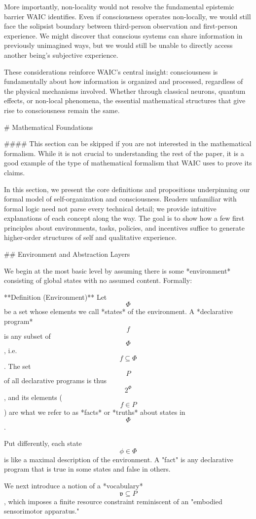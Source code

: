 More importantly, non-locality would not resolve the fundamental epistemic barrier WAIC identifies. Even if consciousness operates non-locally, we would still face the solipsist boundary between third-person observation and first-person experience. We might discover that conscious systems can share information in previously unimagined ways, but we would still be unable to directly access another being's subjective experience.

These considerations reinforce WAIC's central insight: consciousness is fundamentally about how information is organized and processed, regardless of the physical mechanisms involved. Whether through classical neurons, quantum effects, or non-local phenomena, the essential mathematical structures that give rise to consciousness remain the same.

# Mathematical Foundations

#### This section can be skipped if you are not interested in the mathematical formalism. While it is not crucial to understanding the rest of the paper, it is a good example of the type of mathematical formalism that WAIC uses to prove its claims.

In this section, we present the core definitions and propositions underpinning our formal model of self-organization and consciousness. Readers unfamiliar with formal logic need not parse every technical detail; we provide intuitive explanations of each concept along the way. The goal is to show how a few first principles about environments, tasks, policies, and incentives suffice to generate higher-order structures of self and qualitative experience.

## Environment and Abstraction Layers

We begin at the most basic level by assuming there is some *environment* consisting of global states with no assumed content. Formally:

**Definition (Environment)**
Let $$\Phi$$ be a set whose elements we call *states* of the environment. 
A *declarative program* $$f$$ is any subset of $$\Phi$$, i.e. $$f \subseteq \Phi$$. 
The set $$P$$ of all declarative programs is thus $$2^\Phi$$, and its elements ($$f \in P$$) are what we refer to as *facts* or *truths* about states in $$\Phi$$.

Put differently, each state $$\phi \in \Phi$$ is like a maximal description of the environment. A "fact" is any declarative program that is true in some states and false in others.

We next introduce a notion of a *vocabulary* $$\mathfrak{v} \subseteq P$$, which imposes a finite resource constraint reminiscent of an "embodied sensorimotor apparatus."  

